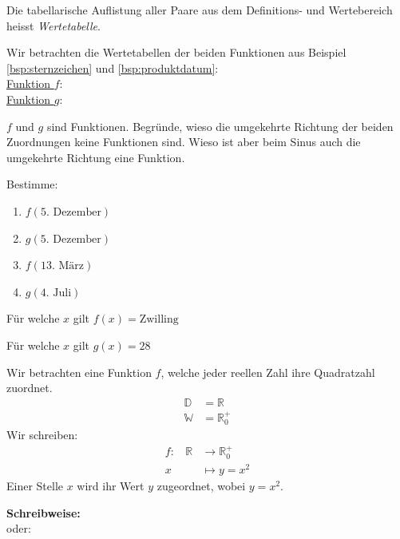 \documentclass[11pt,oneside]{article}
\begin{document}
	\begin{definition}[Wertetabelle]
		Die tabellarische Auflistung aller Paare aus dem Definitions- und Wertebereich heisst \emph{Wertetabelle}.
	\end{definition}
	Wir betrachten die Wertetabellen der beiden Funktionen aus Beispiel \ref{bsp:sternzeichen} und \ref{bsp:produktdatum}:\\
	\underline{Funktion $f$}:\\
	\underline{Funktion $g$}:\\
	\begin{aufgabe}
		$f$ und $g$ sind Funktionen. Begründe, wieso die umgekehrte Richtung der beiden Zuordnungen keine Funktionen sind. Wieso ist aber beim Sinus auch die umgekehrte Richtung eine Funktion.
	\end{aufgabe}
	\begin{aufgabe}
		Bestimme:
		\begin{enumerate}[label=\alph*)]
			\item $f(\text{5. Dezember})$
			\item $g(\text{5. Dezember})$
			\item $f(\text{13. März})$
			\item $g(\text{4. Juli})$
		\end{enumerate}
	\end{aufgabe}
	\begin{aufgabe}
		Für welche $x$ gilt $f(x)=\text{Zwilling}$
	\end{aufgabe}
	\begin{aufgabe}
		Für welche $x$ gilt $g(x)=28$
	\end{aufgabe}
	\begin{beispiel}
		Wir betrachten eine Funktion $f$, welche jeder reellen Zahl ihre Quadratzahl zuordnet.
		\begin{align*}
			\mathbb{D}&=\mathbb{R}\\
			\mathbb{W}&=\mathbb{R}_{0}^{+}
		\end{align*}
		Wir schreiben:
		\begin{align*}
			f:~~~~ \mathbb{R} &\longrightarrow \mathbb{R}_{0}^{+}\\
			x &\longmapsto y=x^2
		\end{align*}
		Einer Stelle $x$ wird ihr Wert $y$ zugeordnet, wobei $y=x^2$.
		\begin{framed}
			\noindent\textbf{Schreibweise:}\vspace{1cm}\\ oder: \vspace{1cm}
		\end{framed}
	\end{beispiel}
\end{document}
